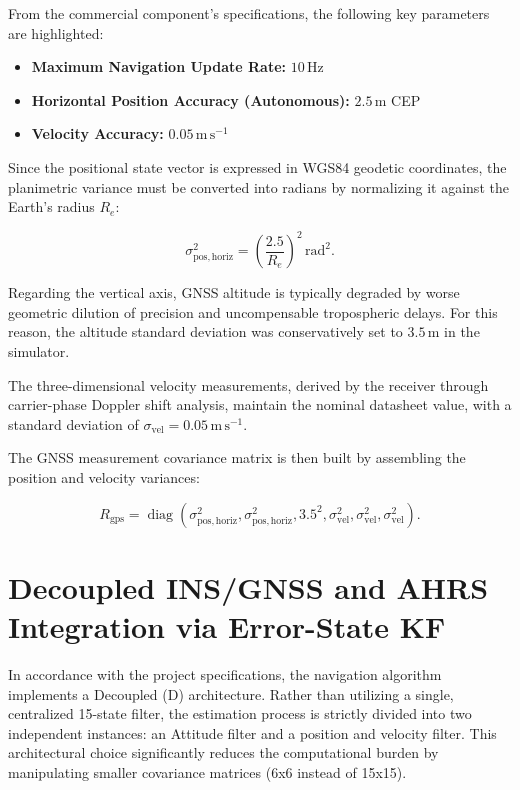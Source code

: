 \documentclass[a4paper,twoside,openany]{report}
\begin{document}
From the commercial component's specifications, the following key parameters are highlighted:

\begin{itemize}
    \item \textbf{Maximum Navigation Update Rate:} $10\,\mathrm{Hz}$
    \item \textbf{Horizontal Position Accuracy (Autonomous):} $2.5\,\mathrm{m}$ CEP
    \item \textbf{Velocity Accuracy:} $0.05\,\mathrm{m\,s^{-1}}$
\end{itemize}

Since the positional state vector is expressed in WGS84 geodetic coordinates, the planimetric variance must be converted into radians by normalizing it against the Earth's radius $R_e$:

\begin{equation}
    \sigma_{\mathrm{pos,horiz}}^2 = \left(\frac{2.5}{R_e}\right)^2\,\mathrm{rad^2}.
\end{equation}

Regarding the vertical axis, GNSS altitude is typically degraded by worse geometric dilution of precision and uncompensable tropospheric delays. For this reason, the altitude standard deviation was conservatively set to $3.5\,\mathrm{m}$ in the simulator.

The three-dimensional velocity measurements, derived by the receiver through carrier-phase Doppler shift analysis, maintain the nominal datasheet value, with a standard deviation of $\sigma_{\mathrm{vel}} = 0.05\,\mathrm{m\,s^{-1}}$.

The GNSS measurement covariance matrix is then built by assembling the position and velocity variances:

\begin{equation}
    R_{\mathrm{gps}} = \operatorname{diag}(\sigma_{\mathrm{pos,horiz}}^2,\sigma_{\mathrm{pos,horiz}}^2,3.5^2,\sigma_{\mathrm{vel}}^2,\sigma_{\mathrm{vel}}^2,\sigma_{\mathrm{vel}}^2).
\end{equation}

\chapter{Decoupled INS/GNSS and AHRS Integration via Error-State KF}

In accordance with the project specifications, the navigation algorithm implements a Decoupled (D) architecture. Rather than utilizing a single, centralized 15-state filter, the estimation process is strictly divided into two independent instances: an Attitude filter and a position and velocity filter. This architectural choice significantly reduces the computational burden by manipulating smaller covariance matrices (6x6 instead of 15x15).
\end{document}
